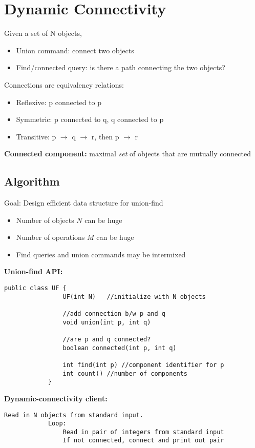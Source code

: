 \documentclass[11pt]{article}
\begin{document}
\section{Dynamic Connectivity}

	Given a set of N objects,
	\begin{itemize}
		\item Union command: connect two objects
		\item Find/connected query: is there a path connecting the two objects?
	\end{itemize}
	Connections are equivalency relations:
	\begin{itemize}
		\item Reflexive: p connected to p
		\item Symmetric: p connected to q, q connected to p
		\item Transitive: p $\rightarrow$ q $\rightarrow$ r, then p $\rightarrow$ r
	\end{itemize}
	\textbf{Connected component:} maximal \emph{set} of objects that are mutually connected
	
	\subsection{Algorithm}
	
		Goal: Design efficient data structure for union-find
		\begin{itemize}
			\item Number of objects $N$ can be huge
			\item Number of operations $M$ can be huge
			\item Find queries and union commands may be intermixed
		\end{itemize}
		\textbf{Union-find API:}
		\begin{lstlisting}[autogobble=true]
			public class UF {
				UF(int N)	//initialize with N objects
				
				//add connection b/w p and q
				void union(int p, int q)
				
				//are p and q connected?
				boolean connected(int p, int q)
				
				int find(int p)	//component identifier for p
				int count()	//number of components
			}
		\end{lstlisting}
		\textbf{Dynamic-connectivity client:}
		\begin{lstlisting}[autogobble=true]
			Read in N objects from standard input.
			Loop:
				Read in pair of integers from standard input
				If not connected, connect and print out pair
		\end{lstlisting}
		
\end{document}
